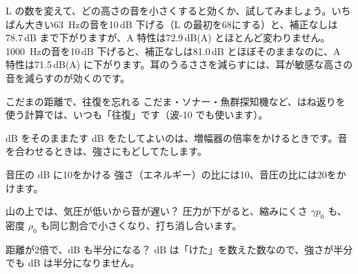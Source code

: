 \noindent L の数を変えて、どの高さの音を小さくすると効くか、試してみましょう。いちばん大きい\qty{63}{Hz}の音を10\,dB 下げる（L の最初を68にする）と、補正なしは78.7\,dB まで下がりますが、A 特性は72.9\,dB(A) とほとんど変わりません。\qty{1000}{Hz}の音を10\,dB 下げると、補正なしは81.0\,dB とほぼそのままなのに、A 特性は71.5\,dB(A) に下がります。耳のうるささを減らすには、耳が敏感な高さの音を減らすのが効くのです。

\begin{tsumazuki}{こだまの距離で、往復を忘れる}
こだま・ソナー・魚群探知機など、はね返りを使う計算では、いつも「往復」です（波-10 でも使います）。
\end{tsumazuki}

\begin{tsumazuki}{dB をそのままたす}
dB をたしてよいのは、増幅器の倍率をかけるときです。音を合わせるときは、強さにもどしてたします。
\end{tsumazuki}

\begin{tsumazuki}{音圧の dB に10をかける}
強さ（エネルギー）の比には10、音圧の比には20をかけます。
\end{tsumazuki}

\begin{tsumazuki}{山の上では、気圧が低いから音が遅い？}
圧力が下がると、縮みにくさ $\gamma p_0$ も、密度 $\rho_0$ も同じ割合で小さくなり、打ち消し合います。
\end{tsumazuki}

\begin{tsumazuki}{距離が2倍で、dB も半分になる？}
dB は「けた」を数えた数なので、強さが半分でも dB は半分になりません。
\end{tsumazuki}

